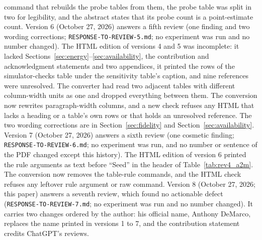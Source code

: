 command that rebuilds the probe tables from them, the probe table was split in two for legibility, and the abstract
states that its probe count is a point-estimate count. Version 6 (October 27, 2026) answers a fifth review
(one finding and two wording corrections; \texttt{RESPONSE-TO-REVIEW-5.md}; no experiment was run and no number
changed). The HTML edition of versions 4 and 5 was incomplete: it lacked Sections~\ref{sec:energy}--\ref{sec:availability}, the
contribution and acknowledgment statements and two appendices, it printed the rows of the simulator-checks table under the
sensitivity table's caption, and nine references were unresolved. The converter had read two adjacent tables with
different column-width units as one and dropped everything between them. The conversion now rewrites paragraph-width
columns, and a new check refuses any HTML that lacks a heading or a table's own rows or that holds an unresolved reference. The
two wording corrections are in Section~\ref{sec:fidelity} and Section~\ref{sec:availability}. Version 7 (October 27, 2026)
answers a sixth review (one cosmetic finding; \texttt{RESPONSE-TO-REVIEW-6.md}; no experiment was run, and no
number or sentence of the PDF changed except this history). The HTML edition of version 6 printed the rule arguments
as text before ``Seed'' in the header of Table~\ref{tab:rev4_a2m}. The conversion now removes the table-rule
commands, and the HTML check refuses any leftover rule argument or raw command. Version 8 (October 27, 2026; this paper) answers a
seventh review, which found no actionable defect (\texttt{RESPONSE-TO-REVIEW-7.md}; no experiment was run and no number
changed). It carries two changes ordered by the author: his official name, Anthony DeMarco, replaces the name printed in versions 1 to 7,
and the contribution statement credits ChatGPT's reviews.

